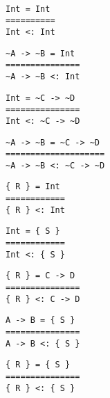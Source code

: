 \begin{example}{~}

\begin{minipage}{.20\linewidth}
\begin{lstlisting}[language=sltc]
Int = Int
==========
Int <: Int
\end{lstlisting}
\end{minipage}
\begin{minipage}{.30\linewidth}
\begin{lstlisting}[language=sltc]
~A -> ~B = Int
===============
~A -> ~B <: Int
\end{lstlisting}
\end{minipage}
\begin{minipage}{.30\linewidth}
\begin{lstlisting}[language=sltc]
Int = ~C -> ~D
===============
Int <: ~C -> ~D
\end{lstlisting}
\end{minipage}

\begin{minipage}{.35\linewidth}
\begin{lstlisting}[language=sltc]
~A -> ~B = ~C -> ~D
====================
~A -> ~B <: ~C -> ~D
\end{lstlisting}
\end{minipage}
\begin{minipage}{.22\linewidth}
\begin{lstlisting}[language=sltc]
{ R } = Int
============
{ R } <: Int
\end{lstlisting}
\end{minipage}
\begin{minipage}{.22\linewidth}
\begin{lstlisting}[language=sltc]
Int = { S }
============
Int <: { S }
\end{lstlisting}
\end{minipage}

\begin{minipage}{.27\linewidth}
\begin{lstlisting}[language=sltc]
{ R } = C -> D
===============
{ R } <: C -> D
\end{lstlisting}
\end{minipage}
\begin{minipage}{.27\linewidth}
\begin{lstlisting}[language=sltc]
A -> B = { S }
===============
A -> B <: { S }
\end{lstlisting}
\end{minipage}
\begin{minipage}{.27\linewidth}
\begin{lstlisting}[language=sltc]
{ R } = { S }
===============
{ R } <: { S }
\end{lstlisting}
\end{minipage}
\label{ex:unfolded-refl}
\end{example}

